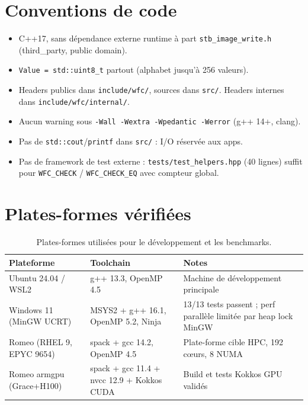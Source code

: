 \section{Conventions de code}
\label{sec:impl:conventions}

\begin{itemize}
    \item C++17, sans dépendance externe runtime à part \texttt{stb\_image\_write.h} (third\_party, public domain).
    \item \texttt{Value = std::uint8\_t} partout (alphabet jusqu'à 256 valeurs).
    \item Headers publics dans \texttt{include/wfc/}, sources dans \texttt{src/}. Headers internes dans \texttt{include/wfc/internal/}.
    \item Aucun warning sous \texttt{-Wall -Wextra -Wpedantic -Werror} (g++ 14+, clang).
    \item Pas de \texttt{std::cout}/\texttt{printf} dans \texttt{src/} : I/O réservée aux apps.
    \item Pas de framework de test externe : \texttt{tests/test\_helpers.hpp} (40 lignes) suffit pour \texttt{WFC\_CHECK} / \texttt{WFC\_CHECK\_EQ} avec compteur global.
\end{itemize}

\section{Plates-formes vérifiées}
\label{sec:impl:plateformes}

\begin{table}[H]
\centering
\begin{tabularx}{\textwidth}{lXX}
\toprule
\textbf{Plateforme} & \textbf{Toolchain} & \textbf{Notes} \\
\midrule
Ubuntu 24.04 / WSL2 & g++ 13.3, OpenMP 4.5 & Machine de développement principale \\
Windows 11 (MinGW UCRT) & MSYS2 + g++ 16.1, OpenMP 5.2, Ninja & 13/13 tests passent ; perf parallèle limitée par heap lock MinGW \\
Romeo (RHEL 9, EPYC 9654) & spack + gcc 14.2, OpenMP 4.5 & Plate-forme cible HPC, 192 cœurs, 8 NUMA \\
Romeo armgpu (Grace+H100) & spack + gcc 11.4 + nvcc 12.9 + Kokkos CUDA & Build et tests Kokkos GPU validés \\
\bottomrule
\end{tabularx}
\caption{Plates-formes utilisées pour le développement et les benchmarks.}
\label{tab:plateformes}
\end{table}

